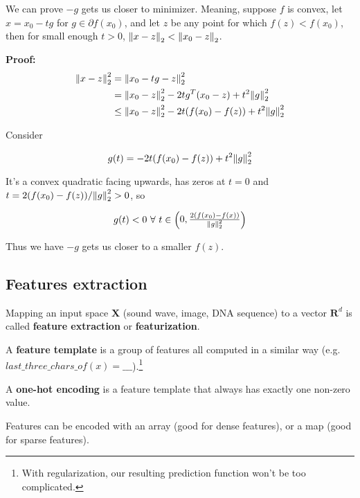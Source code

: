 \documentclass{article}
\begin{document}
We can prove $-g$ gets us closer to minimizer.
Meaning, suppose $f$ is convex, let $x = x_0 - t g$ for $g \in \partial f(x_0)$, and let $z$ be any point for which $f(z) < f(x_0)$, then for small enough $t > 0$, $\norm{x - z}_2 < \norm{x_0 - z}_2$.

\textbf{Proof:}
\begin{align*}
\norm{x - z}_2^2 &= \norm{x_0 - tg - z}_2^2 \\
                 &= \norm{x_0 - z}_2^2 - 2 t g^T (x_0 - z) + t^2 \norm{g}_2^2 \\
                 &\leq \norm{x_0 - z}_2^2 - 2 t (f(x_0) - f(z)) + t^2 \norm{g}_2^2
\end{align*}

Consider

$$
g(t) = - 2 t (f(x_0) - f(z)) + t^2 \norm{g}_2^2
$$

It's a convex quadratic facing upwards, has zeros at $t = 0$ and $t = 2 (f(x_0) - f(z)) / \norm{g}_2^2 > 0$, so

$$
g(t) < 0 ~\forall ~ t \in \begin{pmatrix} 0, \frac{2 (f(x_0) - f(x))}{\norm{g}_2^2} \end{pmatrix}
$$

Thus we have $-g$ gets us closer to a smaller $f(z)$.

\subsection{Features extraction}

Mapping an input space $\mathbf{X}$ (sound wave, image, DNA sequence) to a vector $\mathbf{R}^d$ is called \textbf{feature extraction} or \textbf{featurization}.

A \textbf{feature template} is a group of features all computed in a similar way (e.g. $last\_three\_chars\_of(x) = \_\_\_$).\footnote{With regularization, our resulting prediction function won't be too complicated.}

A \textbf{one-hot encoding} is a feature template that always has exactly one non-zero value.

Features can be encoded with an array (good for dense features), or a map (good for sparse features).
\end{document}
